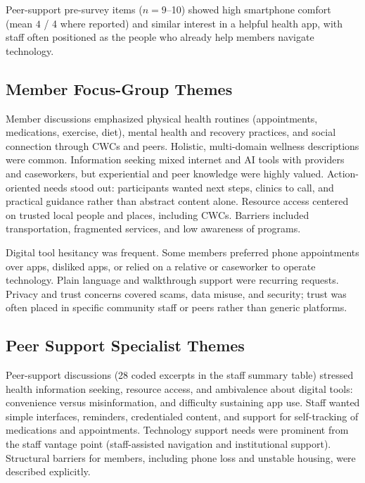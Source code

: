 \documentclass[conference,a4paper]{IEEEtran}
\begin{document}
Peer-support pre-survey items ($n{=}9$--10) showed high smartphone comfort
(mean $4$ / 4 where reported) and similar interest in a helpful health app, with
staff often positioned as the people who already help members navigate
technology.

\subsection{Member Focus-Group Themes}
Member discussions emphasized physical health routines (appointments,
medications, exercise, diet), mental health and recovery practices, and social
connection through CWCs and peers. Holistic, multi-domain wellness descriptions
were common. Information seeking mixed internet and AI tools with providers and
caseworkers, but experiential and peer knowledge were highly valued.
Action-oriented needs stood out: participants wanted next steps, clinics to
call, and practical guidance rather than abstract content alone. Resource access
centered on trusted local people and places, including CWCs. Barriers included
transportation, fragmented services, and low awareness of programs.

Digital tool hesitancy was frequent. Some members preferred phone appointments
over apps, disliked apps, or relied on a relative or caseworker to operate
technology. Plain language and walkthrough support were recurring requests.
Privacy and trust concerns covered scams, data misuse, and security; trust was
often placed in specific community staff or peers rather than generic platforms.

\subsection{Peer Support Specialist Themes}
Peer-support discussions (28 coded excerpts in the staff summary table) stressed
health information seeking, resource access, and ambivalence about digital tools:
convenience versus misinformation, and difficulty sustaining app use. Staff
wanted simple interfaces, reminders, credentialed content, and support for
self-tracking of medications and appointments. Technology support needs were
prominent from the staff vantage point (staff-assisted navigation and
institutional support). Structural barriers for members, including phone loss and
unstable housing, were described explicitly.
\end{document}
